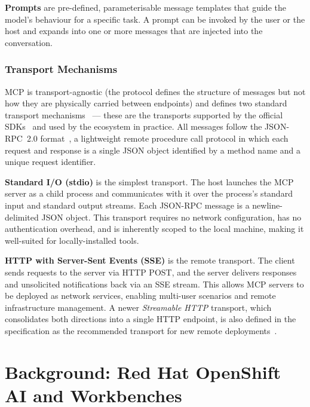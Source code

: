 \documentclass[
  digital,     %
  oneside,     %
  nosansbold,  %
  nocolorbold, %
  lof,         %
  lot,         %
]{fithesis4}
\begin{document}
\textbf{Prompts} are pre-defined, parameterisable message templates that
guide the model's behaviour for a specific task. A prompt can be invoked by
the user or the host and expands into one or more messages that are injected
into the conversation.

\subsection{Transport Mechanisms}
\label{subsec:mcp-transport}

MCP is transport-agnostic (the protocol defines the structure of messages
but not how they are physically carried between endpoints) and defines two
standard transport mechanisms~\parencite{mcp-spec} --- these are the transports
supported by the official SDKs~\parencite{mcp-github} and used by the
ecosystem in practice. All messages follow the
JSON-RPC~2.0 format~\parencite{jsonrpc-spec}, a lightweight remote
procedure call protocol in which each request and response is a single JSON
object identified by a method name and a unique request identifier.

\textbf{Standard I/O (stdio)} is the simplest transport. The host launches
the MCP server as a child process and communicates with it over the process's
standard input and standard output streams. Each JSON-RPC message is a
newline-delimited JSON object. This transport requires no network
configuration, has no authentication overhead, and is inherently scoped to
the local machine, making it well-suited for locally-installed tools.

\textbf{HTTP with Server-Sent Events (SSE)} is the remote transport. The
client sends requests to the server via HTTP POST, and the server delivers
responses and unsolicited notifications back via an SSE stream. This allows
MCP servers to be deployed as network services, enabling multi-user scenarios
and remote infrastructure management. A newer \textit{Streamable HTTP}
transport, which consolidates both directions into a single HTTP endpoint, is
also defined in the specification as the recommended transport for new remote
deployments~\parencite{mcp-spec}.

\chapter{Background: Red Hat OpenShift AI and Workbenches}
\label{chap:rhoai}
\end{document}
